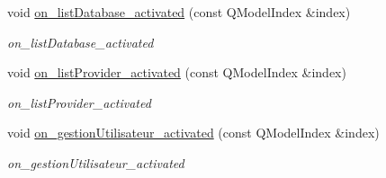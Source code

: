 \begin{DoxyCompactItemize}
void \mbox{\hyperlink{class_main_window_a37382033fa3cefb818a17d198707abe1}{on\+\_\+list\+Database\+\_\+activated}} (const Q\+Model\+Index \&index)
\begin{DoxyCompactList}\small\item\em on\+\_\+list\+Database\+\_\+activated \end{DoxyCompactList}\item 
void \mbox{\hyperlink{class_main_window_a5c37de425b15bf9117aae7b6b67df243}{on\+\_\+list\+Provider\+\_\+activated}} (const Q\+Model\+Index \&index)
\begin{DoxyCompactList}\small\item\em on\+\_\+list\+Provider\+\_\+activated \end{DoxyCompactList}\item 
void \mbox{\hyperlink{class_main_window_a9c3a8c1df5ed2f93b79333aeab5a3323}{on\+\_\+gestion\+Utilisateur\+\_\+activated}} (const Q\+Model\+Index \&index)
\begin{DoxyCompactList}\small\item\em on\+\_\+gestion\+Utilisateur\+\_\+activated \end{DoxyCompactList}\end{DoxyCompactItemize}

